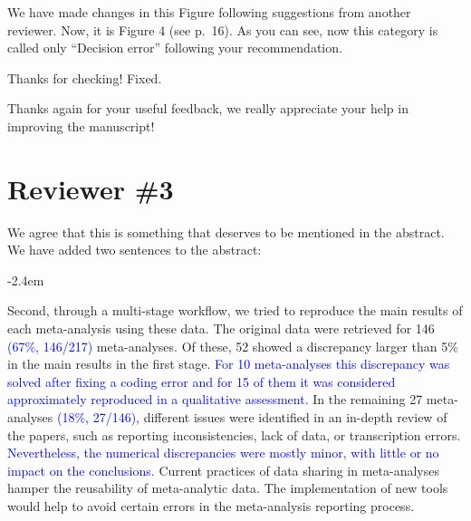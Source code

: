 \documentclass[draft]{article}
\renewenvironment{quote}{\begin{fquote}\advance\leftmargini -2.4em\begin{oldquote}}{\end{oldquote}\end{fquote}}
\newenvironment{fquote}
  {\def\FrameCommand{
	\fboxsep=0.6em %
	\fcolorbox{black}{white}}%
    \MakeFramed {\advance\hsize-2\width \FrameRestore}
    \begin{minipage}{\linewidth}
  }
  {\end{minipage}\endMakeFramed}
\begin{document}
We have made changes in this Figure following suggestions from another reviewer. Now, it is Figure 4 (see p.~16). As you can see, now this category is called only ``Decision error'' following your recommendation.


Thanks for checking! Fixed.


Thanks again for your useful feedback, we really appreciate your help in improving the manuscript!

\newpage

\hypertarget{reviewer-3}{%
\section{Reviewer \#3}\label{reviewer-3}}


We agree that this is something that deserves to be mentioned in the abstract. We have added two sentences to the abstract:

\begin{quote}
Second, through a multi-stage workflow, we tried to reproduce the main results of each meta-analysis using these data. The original data were retrieved for 146 \textcolor{blue}{(67\%, 146/217)} meta-analyses. Of these, 52 showed a discrepancy larger than 5\% in the main results in the first stage. \textcolor{blue}{For 10 meta-analyses this discrepancy was solved after fixing a coding error and for 15 of them it was considered approximately reproduced in a qualitative assessment.} In the remaining 27 meta-analyses \textcolor{blue}{(18\%, 27/146)}, different issues were identified in an in-depth review of the papers, such as reporting inconsistencies, lack of data, or transcription errors. \textcolor{blue}{Nevertheless, the numerical discrepancies were mostly minor, with little or no impact on the conclusions.} Current practices of data sharing in meta-analyses hamper the reusability of meta-analytic data. The implementation of new tools would help to avoid certain errors in the meta-analysis reporting process.
\end{quote}
\end{document}

